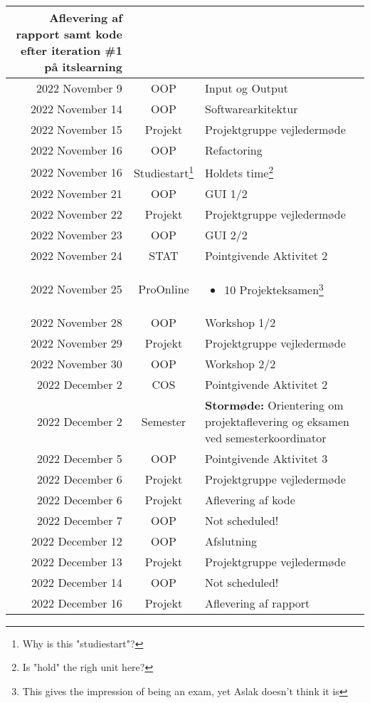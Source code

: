 \begin{longtable}{|r|c|p{}|}
Aflevering af rapport samt kode efter iteration \#1 på itslearning \\
  \hline
  2022 November 9 & OOP & Input og Output \\
  \hline
  2022 November 14 & OOP & Softwarearkitektur \\
  \hline
  2022 November 15 & Projekt & Projektgruppe vejledermøde \\
  \hline
  2022 November 16 & OOP & Refactoring \\
  \hline
  2022 November 16 & Studiestart\footnote{Why is this "studiestart"?} & Holdets time\footnote{Is "hold" the righ unit here?} \\
  \hline
  2022 November 21 & OOP & GUI 1/2 \\
  \hline
  2022 November 22 & Projekt & Projektgruppe vejledermøde \\
  \hline
  2022 November 23 & OOP & GUI 2/2 \\
  \hline
  \rowcolor{orange}2022 November 24 & STAT & Pointgivende Aktivitet 2 \\
  \hline
  2022 November 25 & ProOnline & \begin{itemize}[noitemsep,leftmargin=*,topsep=0pt,partopsep=0pt]

  \item 10 Projekteksamen\footnote{This gives the impression of being an exam, yet Aslak doesn't think it is}

\end{itemize} \\
  \hline
  2022 November 28 & OOP & Workshop 1/2 \\
  \hline
  2022 November 29 & Projekt & Projektgruppe vejledermøde \\
  \hline
  2022 November 30 & OOP & Workshop 2/2 \\
  \hline
  \rowcolor{orange}2022 December 2 & COS & Pointgivende Aktivitet 2 \\
  \hline
  2022 December 2 & Semester & \textbf{Stormøde:} Orientering om projektaflevering og eksamen ved semesterkoordinator \\
  \hline
  \rowcolor{orange}2022 December 5 & OOP & Pointgivende Aktivitet 3 \\
  \hline
  2022 December 6 & Projekt & Projektgruppe vejledermøde \\
  \hline
  \rowcolor{orange}2022 December 6 & Projekt & Aflevering af kode \\
  \hline
  2022 December 7 & OOP & Not scheduled! \\
  \hline
  2022 December 12 & OOP & Afslutning \\
  \hline
  2022 December 13 & Projekt & Projektgruppe vejledermøde \\
  \hline
  2022 December 14 & OOP & Not scheduled! \\
  \hline
  \rowcolor{orange}2022 December 16 & Projekt & Aflevering af rapport \\
  \hline
\end{longtable}
